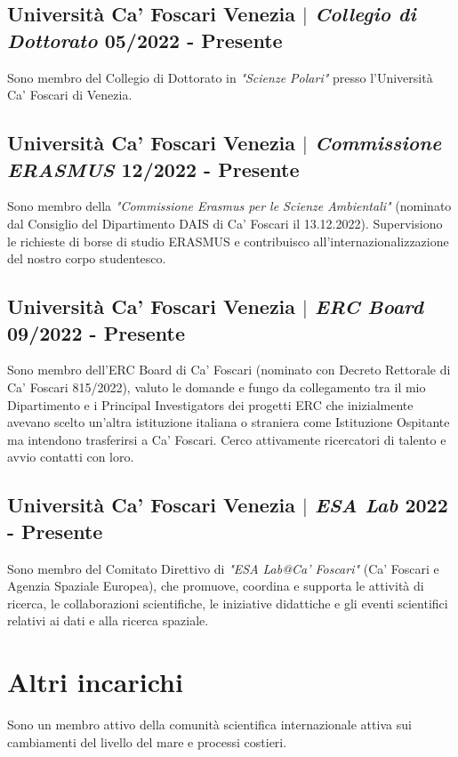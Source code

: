 \documentclass[11pt]{article}
\begin{document}
\subsection{Università Ca' Foscari Venezia $|$ {\normalfont\textit{Collegio di Dottorato}} \hfill 05/2022 - Presente}
{\footnotesize Sono membro del Collegio di Dottorato in \textit{"Scienze Polari"} presso l'Università Ca' Foscari di Venezia.}
\bigskip

\subsection{Università Ca' Foscari Venezia $|$ {\normalfont\textit{Commissione ERASMUS}} \hfill 12/2022 - Presente}
{\footnotesize Sono membro della \textit{"Commissione Erasmus per le Scienze Ambientali"} (nominato dal Consiglio del Dipartimento DAIS di Ca' Foscari il 13.12.2022). Supervisiono le richieste di borse di studio ERASMUS e contribuisco all'internazionalizzazione del nostro corpo studentesco.}
\bigskip

\subsection{Università Ca' Foscari Venezia $|$ {\normalfont\textit{ERC Board}} \hfill 09/2022 - Presente}
{\footnotesize Sono membro dell'ERC Board di Ca' Foscari (nominato con Decreto Rettorale di Ca' Foscari 815/2022), valuto le domande e fungo da collegamento tra il mio Dipartimento e i Principal Investigators dei progetti ERC che inizialmente avevano scelto un'altra istituzione italiana o straniera come Istituzione Ospitante ma intendono trasferirsi a Ca' Foscari. Cerco attivamente ricercatori di talento e avvio contatti con loro.}
\bigskip

\subsection{Università Ca' Foscari Venezia $|$ {\normalfont\textit{ESA Lab}} \hfill 2022 - Presente}
{\footnotesize Sono membro del Comitato Direttivo di \textit{"ESA Lab@Ca' Foscari"} (Ca' Foscari e Agenzia Spaziale Europea), che promuove, coordina e supporta le attività di ricerca, le collaborazioni scientifiche, le iniziative didattiche e gli eventi scientifici relativi ai dati e alla ricerca spaziale.}

\newpage
\section{Altri incarichi}
{\normalfont Sono un membro attivo della comunità scientifica internazionale attiva sui cambiamenti del livello del mare e processi costieri.}\\
\bigskip
\end{document}
